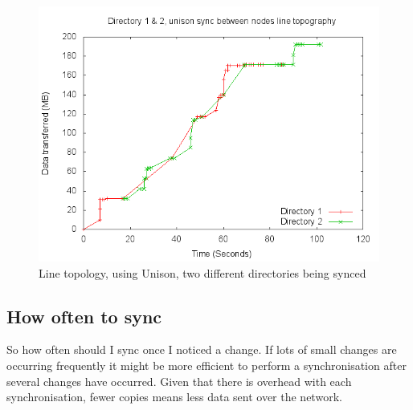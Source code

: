\documentclass[12pt]{article}
\begin{document}
\begin{figure}[htp]
    \centering
    \includegraphics[scale=0.5]{images/line-uni-2dir-comb.png}
    \caption{Line topology, using Unison, two different directories being synced}
    \label{fig:line_uni_2dir_comb_graph}
\end{figure}
\newpage

\subsection{How often to sync}
So how often should I sync once I noticed a change.
If lots of small changes are occurring frequently it might be more efficient
to perform a synchronisation after several changes have occurred. Given that
there is overhead with each synchronisation, fewer copies means less data
sent over the network.
\end{document}
